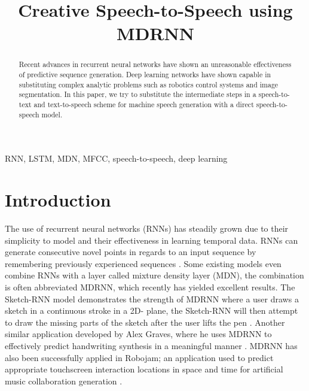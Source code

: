 \documentclass[conference]{IEEEtran}
\begin{document}
\title{Creative Speech-to-Speech using MDRNN\\}

\author{
\and
{}
}

\maketitle

\begin{abstract}
Recent advances in recurrent neural networks have shown an unreasonable effectiveness of predictive sequence generation. Deep learning networks have shown capable in substituting complex analytic problems such as robotics control systems and image segmentation. In this paper, we try to substitute the intermediate steps in a speech-to-text and text-to-speech scheme for machine speech generation with a direct speech-to-speech model. 
\end{abstract}

\begin{IEEEkeywords}
RNN, LSTM, MDN, MFCC, speech-to-speech, deep learning
\end{IEEEkeywords}

\section{Introduction}
The use of recurrent neural networks (RNNs) has steadily grown due to their simplicity to model and their effectiveness in learning temporal data. RNNs can generate consecutive novel points in regards to an input sequence by remembering previously experienced sequences \cite{b6}. Some existing models even combine RNNs with a layer called mixture density layer (MDN), the combination is often abbreviated MDRNN, which recently has yielded excellent results. The Sketch-RNN model demonstrates the strength of MDRNN where a user draws a sketch in a continuous stroke in a 2D- plane, the Sketch-RNN will then attempt to draw the missing parts of the sketch after the user lifts the pen \cite{b7}. Another similar application developed by Alex Graves, where he uses MDRNN to effectively predict handwriting synthesis in a meaningful manner \cite{b6}. MDRNN has also been successfully applied in Robojam; an application used to predict appropriate touchscreen interaction locations in space and time for artificial music collaboration generation \cite{b5}. 
\end{document}
